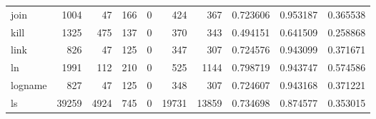 \begin{longtable}{lrrrrrrrrr}
join      &                                1004 &                                              47 &                                            166 &                                             0 &                                            424 &                                          367 &                                           0.723606 &                               0.953187 &                             0.365538 \\
kill      &                                1325 &                                             475 &                                            137 &                                             0 &                                            370 &                                          343 &                                           0.494151 &                               0.641509 &                             0.258868 \\
link      &                                 826 &                                              47 &                                            125 &                                             0 &                                            347 &                                          307 &                                           0.724576 &                               0.943099 &                             0.371671 \\
ln        &                                1991 &                                             112 &                                            210 &                                             0 &                                            525 &                                         1144 &                                           0.798719 &                               0.943747 &                             0.574586 \\
logname   &                                 827 &                                              47 &                                            125 &                                             0 &                                            348 &                                          307 &                                           0.724607 &                               0.943168 &                             0.371221 \\
ls        &                               39259 &                                            4924 &                                            745 &                                             0 &                                          19731 &                                        13859 &                                           0.734698 &                               0.874577 &                             0.353015 \\

\end{longtable}
